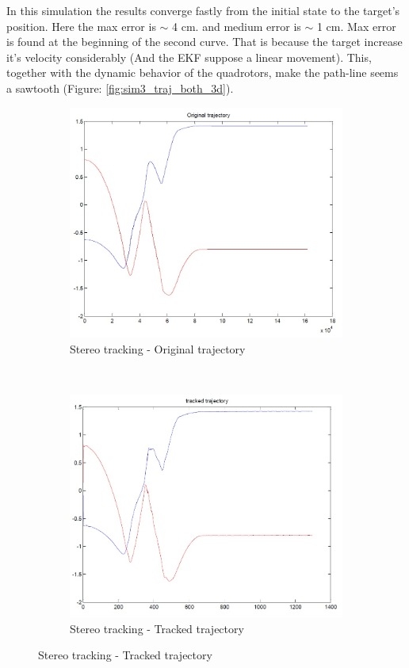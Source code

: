 	In this simulation the results converge fastly from the initial state to the target's position. Here the max error is $\sim$ 4 cm. and medium error is $\sim$ 1 cm. Max error is found at the beginning of the second curve. That is because the target increase it's velocity considerably (And the EKF suppose a linear movement). This, together with the dynamic behavior of the quadrotors, make the path-line seems a sawtooth (Figure: \ref{fig:sim3_traj_both_3d}).
	
\begin{figure}[h]
	\centering
	\begin{subfigure}[b]{0.4\linewidth}
		\centering
		\includegraphics[width=\linewidth]{../Images/c3/sim3_traj_ori}
		\caption{Stereo tracking - Original trajectory}
		\label{fig:sim3_traj_ori}
	\end{subfigure}
	~
	\begin{subfigure}[b]{0.4\linewidth}
		\centering
		\includegraphics[width=\linewidth]{../Images/c3/sim3_traj_track}
		\caption{Stereo tracking - Tracked trajectory}
		\label{fig:sim3_traj_track}
	\end{subfigure}

\end{figure}




